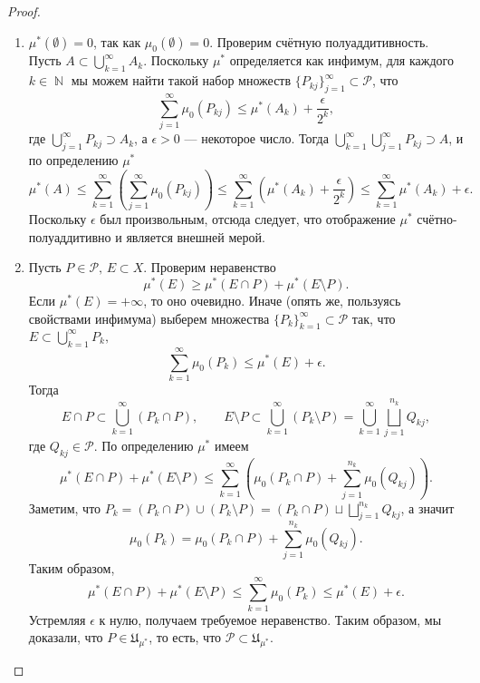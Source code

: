 \documentclass[a4paper]{article}
\theoremstyle{indented}
\theoremstyle{definition}
\theoremstyle{remark}
\DeclareMathOperator{\NN}{\mathbb{N}}
\begin{document}
\begin{proof}

	\

	\begin{enumerate}
		\item $ \mu^*(\emptyset)=0 $, так как $ \mu_0(\emptyset)=0. $ Проверим счётную полуаддитивность. Пусть
		$ A\subset\bigcup_{k=1}^{\infty}A_k $. Поскольку $ \mu^* $ определяется как инфимум, для каждого $ k\in\NN $ мы можем найти такой набор множеств $ \{P_{kj}\}_{j=1}^{\infty}\subset\mathcal{P} $, что 
		\begin{equation*}
			\sum_{j=1}^{\infty}\mu_0(P_{kj})\le \mu^*(A_k)+\frac{\epsilon}{2^k},
		\end{equation*}
		где $ \bigcup_{j=1}^{\infty}P_{kj}\supset A_k $, а $ \epsilon>0 $ --- некоторое  число.
		Тогда $ \bigcup_{k=1}^{\infty}\bigcup_{j=1}^{\infty}P_{kj}\supset A $, и по определению $ \mu^* $
		\begin{equation*}
			\mu^*(A)\le\sum_{k=1}^{\infty}\left(\sum_{j=1}^{\infty}\mu_0(P_{kj})\right)\le \sum_{k=1}^{\infty}\left(\mu^*(A_k)+\frac{\epsilon}{2^k}\right)\le \sum_{k=1}^{\infty}\mu^*(A_k)+\epsilon.
		\end{equation*}
		Поскольку $ \epsilon $ был произвольным, отсюда следует, что отображение $ \mu^* $ счётно-полуаддитивно и является внешней мерой.
		
		\item Пусть $  P\in\mathcal{P},\,E\subset X $. Проверим неравенство 
		\begin{equation*}
			\mu^*(E)\ge\mu^*(E\cap P)+\mu^*(E\setminus P).
		\end{equation*}
		Если $ \mu^*(E)=+\infty $, то оно очевидно. Иначе (опять же, пользуясь свойствами инфимума) выберем множества $ \{P_k\}_{k=1}^{\infty}\subset \mathcal{P} $ так, что $  E\subset\bigcup_{k=1}^{\infty}P_k, $
		\begin{equation*}
			\sum_{k=1}^{\infty}\mu_0(P_k)\le \mu^*(E)+\epsilon.
		\end{equation*}
		Тогда 
		$$ 
			E\cap P\subset \bigcup_{k=1}^{\infty}(P_k\cap P),\qquad E\setminus P\subset\bigcup_{k=1}^{\infty}(P_k\setminus P)=\bigcup_{k=1}^{\infty}\bigsqcup_{j=1}^{n_k}Q_{kj}, 
		$$ 
		где $ Q_{kj}\in\mathcal{P} $. По определению $ \mu^* $ имеем 
		\begin{equation*}
			\mu^*(E\cap P)+\mu^*(E\setminus P)\le \sum_{k=1}^{\infty}\left(\mu_0(P_k\cap P)+\sum_{j=1}^{n_k}\mu_0(Q_{kj})\right).
		\end{equation*}
		Заметим, что $ P_k=(P_k\cap P)\cup(P_k\setminus P)=(P_k\cap P)\sqcup \bigsqcup_{j=1}^{n_k}Q_{kj}$, а значит 
		\begin{equation*}
			\mu_0(P_k)=\mu_0(P_k\cap P)+\sum_{j=1}^{n_k}{\mu_0(Q_{kj})}.
		\end{equation*}
		Таким образом,
		\begin{equation*}
			\mu^*(E\cap P)+\mu^*(E\setminus P)\le \sum_{k=1}^{\infty}\mu_0(P_k)\le \mu^*(E)+\epsilon.
		\end{equation*}
		Устремляя $ \epsilon $ к нулю, получаем требуемое неравенство.
		Таким образом, мы доказали, что $ P\in \mathfrak{U}_{\mu^*} $, то есть, что $ \mathcal{P}\subset \mathfrak{U}_{\mu^*} $.
		

\end{enumerate}
\end{proof}
\end{document}
